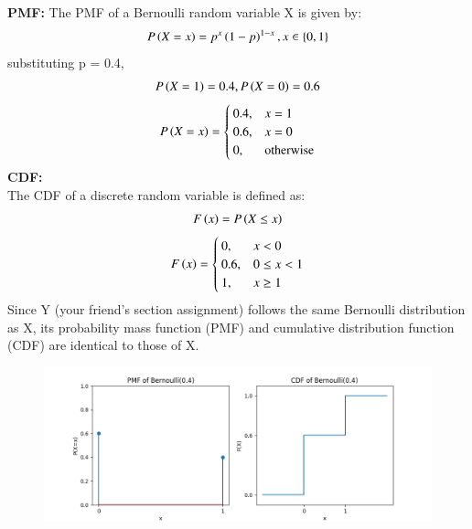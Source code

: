 \documentclass[journal]{IEEEtran}
\numberwithin{equation}{enumi}
\numberwithin{figure}{enumi}
\begin{document}
\textbf{PMF:}
The PMF of a Bernoulli random variable X is given by:
\begin{align}
	P\left(X = x\right) = p^x\left(1 - p\right)^{1 - x}, x \in \left\{0,1\right\}
\end{align}
substituting p = 0.4,\\
\begin{align}
 P\left(X = 1\right) = 0.4, P\left(X = 0\right) = 0.6
\end{align}
\begin{align}
	P\left(X = x\right) = \begin{cases}
		0.4, & x = 1 \\
		0.6, & x = 0 \\
		0, & \text{otherwise}
	\end{cases}
\end{align}
\textbf{CDF:}\\
The CDF of a discrete random variable is defined as:\\
\begin{align}
	F\left(x\right) = P\left(X \leq x\right)
\end{align}
\begin{align}
        F\left(x\right) = \begin{cases}
                0, & x < 0 \\
                0.6, & 0 \leq x < 1  \\
                1, & x \geq 1
        \end{cases}
\end{align}
Since Y (your friend's section assignment) follows the same Bernoulli distribution as X, its probability mass function (PMF) and cumulative distribution function (CDF) are identical to those of X.\\
\begin{figure}[H]
    \centering
    \includegraphics[width=\textwidth]{figs/fig.png}
\end{figure}
\end{document}
